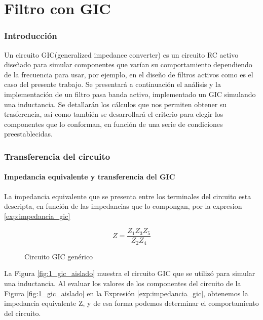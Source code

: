 \part{Filtro con GIC}
\section{Introducción}
Un circuito GIC(generalized impedance converter) es un circuito RC activo diseñado para simular componentes que varían su comportamiento dependiendo de la frecuencia para usar, por ejemplo, en el diseño de filtros activos como es el caso del presente trabajo.
Se presentará a continuación el análisis y la implementación de un filtro pasa banda activo, implementado un GIC simulando una inductancia. Se detallarán los cálculos que nos permiten obtener su trasferencia, así como también se desarrollará el criterio para elegir los componentes que lo conforman, en función de una serie de condiciones preestablecidas.

\section{Transferencia del circuito}
\subsection{Impedancia equivalente y transferencia del GIC}

La impedancia equivalente que se presenta entre los terminales del circuito esta descripta, en función de las impedancias que lo compongan, por la expresion \ref{exp:impedancia_gic}

\begin{equation}
Z = \frac{Z_1Z_3Z_5}{Z_2Z_4}
\label{exp:impedancia_gic}
\end{equation}



\begin{figure}[h]
\centering

\caption{Circuito GIC genérico}
\label{fig:1_gic_generico}
\end{figure}

La Figura \ref{fig:1_gic_aislado} muestra el circuito GIC que se utilizó para simular una inductancia. Al evaluar los valores de los componentes del circuito de la Figura \ref{fig:1_gic_aislado} en la Expresión \ref{exp:impedancia_gic}, obtenemos la impedancia equivalente Z, y de esa forma podemos determinar el comportamiento del circuito.

